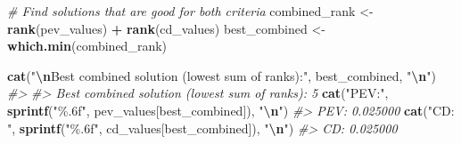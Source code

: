 \documentclass[
]{article}
\newenvironment{Shaded}{\begin{snugshade}}{\end{snugshade}}
\newcommand{\CommentTok}[1]{\textcolor[rgb]{0.56,0.35,0.01}{\textit{#1}}}
\newcommand{\FunctionTok}[1]{\textcolor[rgb]{0.13,0.29,0.53}{\textbf{#1}}}
\newcommand{\NormalTok}[1]{#1}
\newcommand{\OtherTok}[1]{\textcolor[rgb]{0.56,0.35,0.01}{#1}}
\newcommand{\SpecialCharTok}[1]{\textcolor[rgb]{0.81,0.36,0.00}{\textbf{#1}}}
\newcommand{\StringTok}[1]{\textcolor[rgb]{0.31,0.60,0.02}{#1}}
\begin{document}
\begin{Shaded}
\begin{Highlighting}[]
\CommentTok{\# Find solutions that are good for both criteria}
\NormalTok{combined\_rank }\OtherTok{\textless{}{-}} \FunctionTok{rank}\NormalTok{(pev\_values) }\SpecialCharTok{+} \FunctionTok{rank}\NormalTok{(cd\_values)}
\NormalTok{best\_combined }\OtherTok{\textless{}{-}} \FunctionTok{which.min}\NormalTok{(combined\_rank)}

\FunctionTok{cat}\NormalTok{(}\StringTok{"}\SpecialCharTok{\textbackslash{}n}\StringTok{Best combined solution (lowest sum of ranks):"}\NormalTok{, best\_combined, }\StringTok{"}\SpecialCharTok{\textbackslash{}n}\StringTok{"}\NormalTok{)}
\CommentTok{\#\textgreater{} }
\CommentTok{\#\textgreater{} Best combined solution (lowest sum of ranks): 5}
\FunctionTok{cat}\NormalTok{(}\StringTok{"PEV:"}\NormalTok{, }\FunctionTok{sprintf}\NormalTok{(}\StringTok{"\%.6f"}\NormalTok{, pev\_values[best\_combined]), }\StringTok{"}\SpecialCharTok{\textbackslash{}n}\StringTok{"}\NormalTok{)}
\CommentTok{\#\textgreater{} PEV: 0.025000}
\FunctionTok{cat}\NormalTok{(}\StringTok{"CD: "}\NormalTok{, }\FunctionTok{sprintf}\NormalTok{(}\StringTok{"\%.6f"}\NormalTok{, cd\_values[best\_combined]), }\StringTok{"}\SpecialCharTok{\textbackslash{}n}\StringTok{"}\NormalTok{)}
\CommentTok{\#\textgreater{} CD:  0.025000}
\end{Highlighting}
\end{Shaded}
\end{document}
